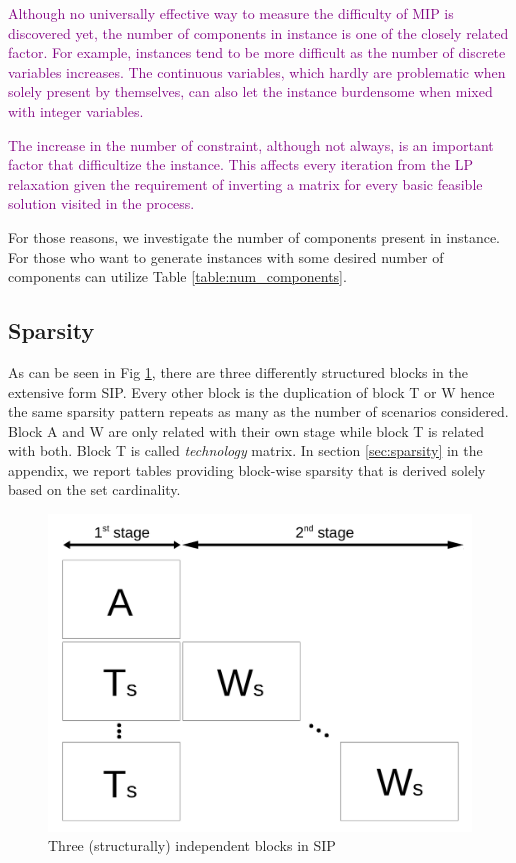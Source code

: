 \textcolor{purple}{Although no universally effective way to measure the difficulty of MIP is discovered yet, the number of components in instance is one of the closely related factor. For example, instances tend to be more difficult as the number of discrete variables increases. The continuous variables, which hardly are problematic when solely present by themselves, can also let the instance burdensome when mixed with integer variables. } 

\textcolor{purple}{The increase in the number of constraint, although not always, is an important factor that difficultize the instance. This affects every iteration from the LP relaxation given the requirement of inverting a matrix for every basic feasible solution visited in the process.}

For those reasons, we investigate the number of components present in instance. For those who want to generate instances with some desired number of components can utilize Table \ref{table:num_components}.



\subsection{Sparsity}
As can be seen in Fig \ref{fig:stagewise_sparsity}, there are three differently structured blocks in the extensive form SIP. Every other block is the duplication of block T or W hence the same sparsity pattern repeats as many as the number of scenarios considered. Block A and W are only related with their own stage while block T is related with both. Block T is called \textit{technology}  matrix. In section \ref{sec:sparsity} in the appendix, we report tables providing block-wise sparsity that is derived solely based on the set cardinality.
\begin{figure}
	\centering
	\includegraphics[width=0.7\linewidth]{drawings/stagewise_sparsity}
	\caption{Three (structurally) independent blocks in SIP}
	\label{fig:stagewise_sparsity}
\end{figure}

